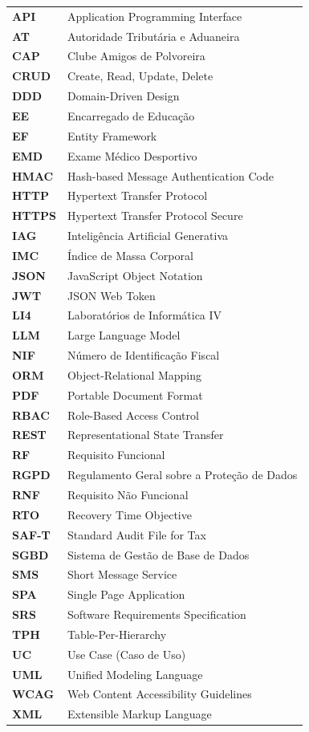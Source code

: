 \documentclass[a4paper,12pt]{scrreprt}
\begin{document}
\begin{tabular}{ll}
\textbf{API}    & Application Programming Interface \\
\textbf{AT}     & Autoridade Tributária e Aduaneira \\
\textbf{CAP}    & Clube Amigos de Polvoreira \\
\textbf{CRUD}   & Create, Read, Update, Delete \\
\textbf{DDD}    & Domain-Driven Design \\
\textbf{EE}     & Encarregado de Educação \\
\textbf{EF}     & Entity Framework \\
\textbf{EMD}    & Exame Médico Desportivo \\
\textbf{HMAC}   & Hash-based Message Authentication Code \\
\textbf{HTTP}   & Hypertext Transfer Protocol \\
\textbf{HTTPS}  & Hypertext Transfer Protocol Secure \\
\textbf{IAG}    & Inteligência Artificial Generativa \\
\textbf{IMC}    & Índice de Massa Corporal \\
\textbf{JSON}   & JavaScript Object Notation \\
\textbf{JWT}    & JSON Web Token \\
\textbf{LI4}    & Laboratórios de Informática IV \\
\textbf{LLM}    & Large Language Model \\
\textbf{NIF}    & Número de Identificação Fiscal \\
\textbf{ORM}    & Object-Relational Mapping \\
\textbf{PDF}    & Portable Document Format \\
\textbf{RBAC}   & Role-Based Access Control \\
\textbf{REST}   & Representational State Transfer \\
\textbf{RF}     & Requisito Funcional \\
\textbf{RGPD}   & Regulamento Geral sobre a Proteção de Dados \\
\textbf{RNF}    & Requisito Não Funcional \\
\textbf{RTO}    & Recovery Time Objective \\
\textbf{SAF-T}  & Standard Audit File for Tax \\
\textbf{SGBD}   & Sistema de Gestão de Base de Dados \\
\textbf{SMS}    & Short Message Service \\
\textbf{SPA}    & Single Page Application \\
\textbf{SRS}    & Software Requirements Specification \\
\textbf{TPH}    & Table-Per-Hierarchy \\
\textbf{UC}     & Use Case (Caso de Uso) \\
\textbf{UML}    & Unified Modeling Language \\
\textbf{WCAG}   & Web Content Accessibility Guidelines \\
\textbf{XML}    & Extensible Markup Language \\
\end{tabular}
\end{document}
